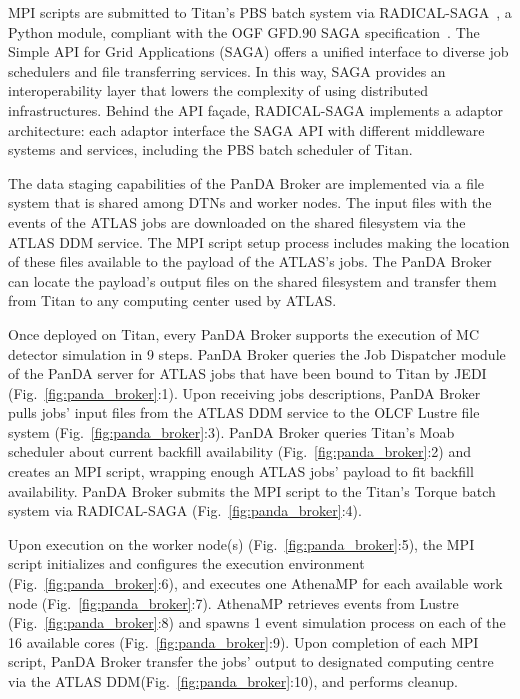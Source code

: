 MPI scripts are submitted to Titan's PBS batch system via
RADICAL-SAGA~\cite{radical-saga_url}, a Python module, compliant with the OGF
GFD.90 SAGA specification~\cite{goodale2008simple}. The Simple API for Grid
Applications (SAGA) offers a unified interface to diverse job schedulers and
file transferring services. In this way, SAGA provides an interoperability layer
that lowers the complexity of using distributed infrastructures. Behind the API
façade, RADICAL-SAGA implements a adaptor architecture: each adaptor interface
the SAGA API with different middleware systems and services, including the PBS
batch scheduler of Titan.

The data staging capabilities of the PanDA Broker are implemented via a file
system that is shared among DTNs and worker nodes. The input files with the
events of the ATLAS jobs are downloaded on the shared filesystem via the ATLAS
DDM service. The MPI script setup process includes making the location of these
files available to the payload of the ATLAS's jobs. The PanDA Broker can locate
the payload's output files on the shared filesystem and transfer them from Titan
to any computing center used by ATLAS.

Once deployed on Titan, every PanDA Broker supports the execution of MC detector
simulation in 9 steps. PanDA Broker queries the Job Dispatcher module of the
PanDA server for ATLAS jobs that have been bound to Titan by JEDI
(Fig.~\ref{fig:panda_broker}:1). Upon receiving jobs descriptions, PanDA Broker
pulls jobs' input files from the ATLAS DDM service to the OLCF Lustre file
system (Fig.~\ref{fig:panda_broker}:3). PanDA Broker queries Titan's Moab
scheduler about current backfill availability (Fig.~\ref{fig:panda_broker}:2)
and creates an MPI script, wrapping enough ATLAS jobs' payload to fit backfill
availability. PanDA Broker submits the MPI script to the Titan's Torque batch
system via RADICAL-SAGA (Fig.~\ref{fig:panda_broker}:4).

Upon execution on the worker node(s) (Fig.~\ref{fig:panda_broker}:5), the MPI
script initializes and configures the execution environment
(Fig.~\ref{fig:panda_broker}:6), and executes one AthenaMP for each available
work node (Fig.~\ref{fig:panda_broker}:7). AthenaMP retrieves events from Lustre
(Fig.~\ref{fig:panda_broker}:8) and spawns 1 event simulation process on each of
the 16 available cores (Fig.~\ref{fig:panda_broker}:9).
Upon completion of each MPI script, PanDA Broker transfer the jobs' output to
designated computing centre via the ATLAS DDM(Fig.~\ref{fig:panda_broker}:10),
and performs cleanup.

